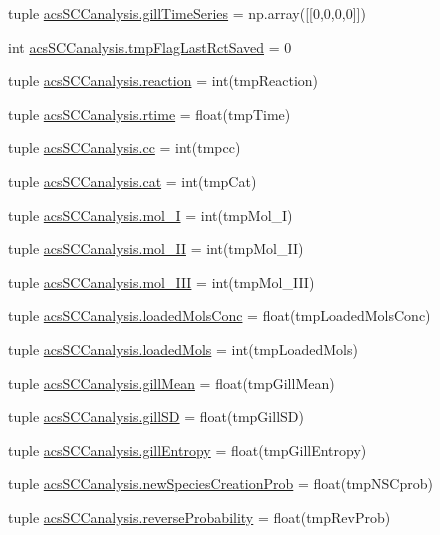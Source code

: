 \begin{DoxyCompactItemize}
\item 
tuple \hyperlink{a00128_a99669fe823cebc560b46c3746f9183e7}{acs\-S\-C\-Canalysis.\-gill\-Time\-Series} = np.\-array(\mbox{[}\mbox{[}0,0,0,0\mbox{]}\mbox{]})
\item 
int \hyperlink{a00128_a6e8aff976901d1424dd1ff00c3387014}{acs\-S\-C\-Canalysis.\-tmp\-Flag\-Last\-Rct\-Saved} = 0
\item 
tuple \hyperlink{a00128_a58c3618ec28f27dfbf09e0d3aba05bc7}{acs\-S\-C\-Canalysis.\-reaction} = int(tmp\-Reaction)
\item 
tuple \hyperlink{a00128_a162a08b0497058c76e7e885c03a01336}{acs\-S\-C\-Canalysis.\-rtime} = float(tmp\-Time)
\item 
tuple \hyperlink{a00128_a67fcb77a15f51e94c98bb48b05865715}{acs\-S\-C\-Canalysis.\-cc} = int(tmpcc)
\item 
tuple \hyperlink{a00128_aea872e34fe0da6302f6195f1b2315148}{acs\-S\-C\-Canalysis.\-cat} = int(tmp\-Cat)
\item 
tuple \hyperlink{a00128_ae13d6607ffa236891a9af05bfa88cfcc}{acs\-S\-C\-Canalysis.\-mol\-\_\-\-I} = int(tmp\-Mol\-\_\-\-I)
\item 
tuple \hyperlink{a00128_a8f2878f5909e4aeb9155a1103eaba413}{acs\-S\-C\-Canalysis.\-mol\-\_\-\-I\-I} = int(tmp\-Mol\-\_\-\-I\-I)
\item 
tuple \hyperlink{a00128_a20047e8516f386a7e98ffa0efec09471}{acs\-S\-C\-Canalysis.\-mol\-\_\-\-I\-I\-I} = int(tmp\-Mol\-\_\-\-I\-I\-I)
\item 
tuple \hyperlink{a00128_abe83f5e0ae3bd65da15a697a979aeea1}{acs\-S\-C\-Canalysis.\-loaded\-Mols\-Conc} = float(tmp\-Loaded\-Mols\-Conc)
\item 
tuple \hyperlink{a00128_ab4566d46d368eb4f93ff6db5191648bd}{acs\-S\-C\-Canalysis.\-loaded\-Mols} = int(tmp\-Loaded\-Mols)
\item 
tuple \hyperlink{a00128_a4e862896701636d17752f14810ff687f}{acs\-S\-C\-Canalysis.\-gill\-Mean} = float(tmp\-Gill\-Mean)
\item 
tuple \hyperlink{a00128_acdb3e72aea08c29494799fd08763b406}{acs\-S\-C\-Canalysis.\-gill\-S\-D} = float(tmp\-Gill\-S\-D)
\item 
tuple \hyperlink{a00128_a4c214eb4f6812d6182bae32715bce3ad}{acs\-S\-C\-Canalysis.\-gill\-Entropy} = float(tmp\-Gill\-Entropy)
\item 
tuple \hyperlink{a00128_a47b24df6e487f6dd90158dde93cc7c93}{acs\-S\-C\-Canalysis.\-new\-Species\-Creation\-Prob} = float(tmp\-N\-S\-Cprob)
\item 
tuple \hyperlink{a00128_aa7db2dba66810044f9c5238eccc995b7}{acs\-S\-C\-Canalysis.\-reverse\-Probability} = float(tmp\-Rev\-Prob)

\end{DoxyCompactItemize}
